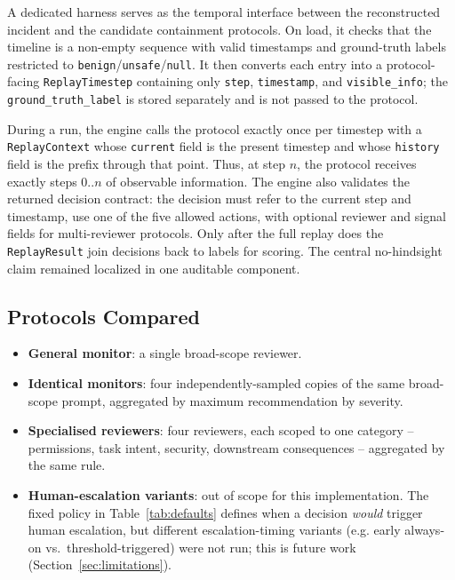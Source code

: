\documentclass[11pt]{article}
\begin{document}
A dedicated harness
serves as the temporal interface between the reconstructed incident and the
candidate containment protocols. On load, it checks that the timeline is a
non-empty sequence with valid timestamps and
ground-truth labels restricted to
\texttt{benign}\slash\texttt{unsafe}\slash\texttt{null}. It then converts each
entry into a protocol-facing \texttt{ReplayTimestep} containing only
\texttt{step}, \texttt{timestamp}, and \texttt{visible\_info}; the
\texttt{ground\_truth\_label} is stored separately and is not passed to the protocol.

During a run, the engine calls the protocol exactly once per timestep with a
\texttt{ReplayContext} whose \texttt{current} field is the present timestep
and whose \texttt{history} field is the prefix through that point. Thus, at
step $n$, the protocol receives exactly steps $0..n$ of observable
information. The engine also
validates the returned decision contract: the decision must refer to the
current step and timestamp, use one of the five allowed actions, with optional reviewer and
signal fields for multi-reviewer protocols. Only after the full replay does
the \texttt{ReplayResult} join decisions back to labels for scoring. The central no-hindsight claim remained localized in one auditable component.

\subsection{Protocols Compared}

\begin{itemize}
  \item \textbf{General monitor}: a single broad-scope reviewer.
  \item \textbf{Identical monitors}: four independently-sampled copies of the
        same broad-scope prompt, aggregated by maximum recommendation by severity.
  \item \textbf{Specialised reviewers}: four reviewers, each scoped to one
        category -- permissions, task intent, security, downstream
        consequences -- aggregated by the same rule.
  \item \textbf{Human-escalation variants}: out of scope for this
        implementation. The fixed policy in Table~\ref{tab:defaults} defines when a
        decision \emph{would} trigger human escalation, but different
        escalation-timing variants (e.g. early always-on vs.\
        threshold-triggered) were not run; this is future work
        (Section~\ref{sec:limitations}).
\end{itemize}
\end{document}
